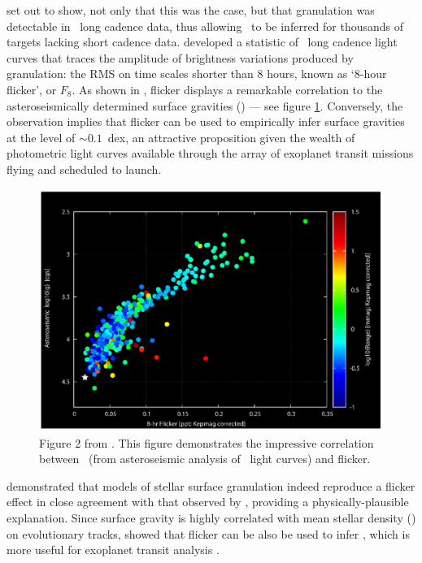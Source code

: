 \citet{Bastien2013} set out to show, not only that this was the case, but that
granulation was detectable in \kepler\ long cadence data, thus allowing \logg\
to be inferred for thousands of targets lacking short cadence data.
\citet{Bastien2013} developed a statistic of \kepler\ long cadence light
curves that traces the amplitude of brightness variations produced
by granulation: the RMS on time scales shorter than 8 hours, known as `8-hour
flicker', or $F_8$.
As shown in \citet{Bastien2013}, flicker displays a remarkable correlation to
the asteroseismically determined surface gravities (\logg) --- see
figure \ref{fig:bastien}.
Conversely, the observation implies that flicker can be used to
empirically infer surface gravities at the level of $\sim0.1$\ dex, an
attractive proposition given the wealth of photometric light curves available
through the array of exoplanet transit missions flying and scheduled to
launch.

\begin{figure}
\begin{center}
\includegraphics[width=6in,angle=0,clip=true]{figures/flicker_bastien.pdf}
\caption[Flicker versus stellar surface gravity, from \citet{Bastien2013}.]
{Figure 2 from \citet{Bastien2013}.
This figure demonstrates the impressive correlation between \logg\ (from
asteroseismic analysis of \kepler\ light curves) and flicker.}
\label{fig:bastien}
\end{center}
\end{figure}

\citet{Cranmer2014} demonstrated that models of stellar surface granulation
indeed reproduce a flicker effect in close agreement with that observed by
\citet{Bastien2013}, providing a physically-plausible explanation.
Since surface gravity is highly correlated with mean stellar density (\rhostar)
on evolutionary tracks, \citet{Kipping2014} showed that flicker can be also
be used to infer \rhostar, which is more useful for exoplanet transit analysis
\citep{Seager2003}.

